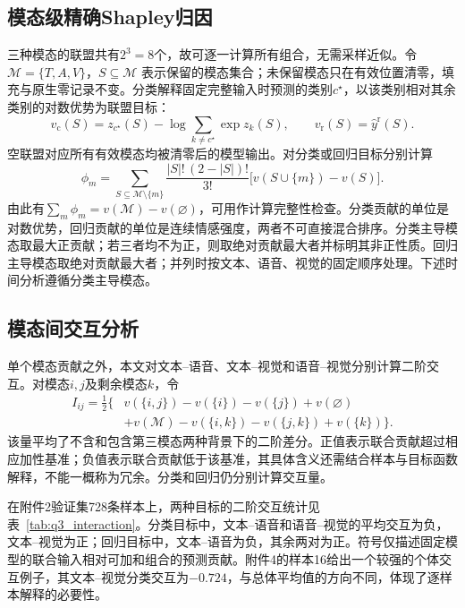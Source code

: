 \subsection{模态级精确Shapley归因}\label{subsec:q3_shapley}
三种模态的联盟共有$2^3=8$个，故可逐一计算所有组合，无需采样近似。令$\mathcal M=\{T,A,V\}$，$S\subseteq\mathcal M$ 表示保留的模态集合；未保留模态只在有效位置清零，填充与原生零记录不变。分类解释固定完整输入时预测的类别$c^\star$，以该类别相对其余类别的对数优势为联盟目标：
\begin{equation}
v_{\mathrm c}(S)
=z_{c^\star}(S)-\log\!\sum_{k\ne c^\star}\exp z_k(S),
\qquad
v_{\mathrm r}(S)=\widehat y^{\mathrm r}(S).
\label{eq:q3_value}
\end{equation}
空联盟对应所有有效模态均被清零后的模型输出。对分类或回归目标分别计算
\begin{equation}
\phi_m
=\sum_{S\subseteq\mathcal M\setminus\{m\}}
\frac{|S|!\,(2-|S|)!}{3!}
\bigl[v(S\cup\{m\})-v(S)\bigr].
\label{eq:q3_shapley}
\end{equation}
由此有$\sum_m\phi_m=v(\mathcal M)-v(\varnothing)$，可用作计算完整性检查。分类贡献的单位是对数优势，回归贡献的单位是连续情感强度，两者不可直接混合排序。分类主导模态取最大正贡献；若三者均不为正，则取绝对贡献最大者并标明其非正性质。回归主导模态取绝对贡献最大者；并列时按文本、语音、视觉的固定顺序处理。下述时间分析遵循分类主导模态。

\subsection{模态间交互分析}\label{subsec:q3_interaction}
单个模态贡献之外，本文对文本--语音、文本--视觉和语音--视觉分别计算二阶交互。对模态$i,j$及剩余模态$k$，令
\begin{equation}
\begin{aligned}
I_{ij}=\tfrac12\{&
v(\{i,j\})-v(\{i\})-v(\{j\})+v(\varnothing)\\
&+v(\mathcal M)-v(\{i,k\})-v(\{j,k\})+v(\{k\})\}.
\end{aligned}
\label{eq:q3_interaction}
\end{equation}
该量平均了不含和包含第三模态两种背景下的二阶差分。正值表示联合贡献超过相应加性基准；负值表示联合贡献低于该基准，其具体含义还需结合样本与目标函数解释，不能一概称为冗余。分类和回归仍分别计算交互量。

在附件2验证集728条样本上，两种目标的二阶交互统计见表~\ref{tab:q3_interaction}。分类目标中，文本--语音和语音--视觉的平均交互为负，文本--视觉为正；回归目标中，文本--语音为负，其余两对为正。符号仅描述固定模型的联合输入相对可加和组合的预测贡献。附件4的样本16给出一个较强的个体交互例子，其文本--视觉分类交互为$-0.724$，与总体平均值的方向不同，体现了逐样本解释的必要性。

